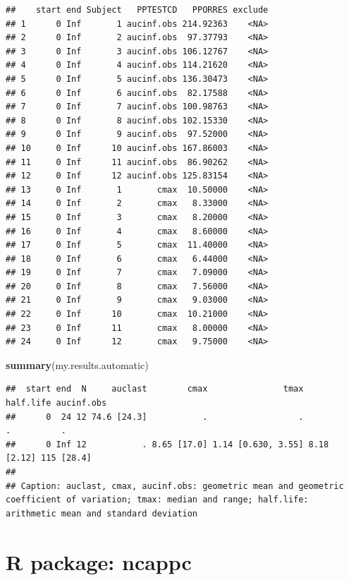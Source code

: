 \documentclass[
  12pt,
]{krantz}
\newenvironment{Shaded}{\begin{snugshade}}{\end{snugshade}}
\newcommand{\KeywordTok}[1]{\textcolor[rgb]{0.13,0.29,0.53}{\textbf{#1}}}
\newcommand{\NormalTok}[1]{#1}
\begin{document}
\begin{verbatim}
##    start end Subject   PPTESTCD   PPORRES exclude
## 1      0 Inf       1 aucinf.obs 214.92363    <NA>
## 2      0 Inf       2 aucinf.obs  97.37793    <NA>
## 3      0 Inf       3 aucinf.obs 106.12767    <NA>
## 4      0 Inf       4 aucinf.obs 114.21620    <NA>
## 5      0 Inf       5 aucinf.obs 136.30473    <NA>
## 6      0 Inf       6 aucinf.obs  82.17588    <NA>
## 7      0 Inf       7 aucinf.obs 100.98763    <NA>
## 8      0 Inf       8 aucinf.obs 102.15330    <NA>
## 9      0 Inf       9 aucinf.obs  97.52000    <NA>
## 10     0 Inf      10 aucinf.obs 167.86003    <NA>
## 11     0 Inf      11 aucinf.obs  86.90262    <NA>
## 12     0 Inf      12 aucinf.obs 125.83154    <NA>
## 13     0 Inf       1       cmax  10.50000    <NA>
## 14     0 Inf       2       cmax   8.33000    <NA>
## 15     0 Inf       3       cmax   8.20000    <NA>
## 16     0 Inf       4       cmax   8.60000    <NA>
## 17     0 Inf       5       cmax  11.40000    <NA>
## 18     0 Inf       6       cmax   6.44000    <NA>
## 19     0 Inf       7       cmax   7.09000    <NA>
## 20     0 Inf       8       cmax   7.56000    <NA>
## 21     0 Inf       9       cmax   9.03000    <NA>
## 22     0 Inf      10       cmax  10.21000    <NA>
## 23     0 Inf      11       cmax   8.00000    <NA>
## 24     0 Inf      12       cmax   9.75000    <NA>
\end{verbatim}

\begin{Shaded}
\begin{Highlighting}[]
\KeywordTok{summary}\NormalTok{(my.results.automatic)}
\end{Highlighting}
\end{Shaded}

\begin{verbatim}
##  start end  N     auclast        cmax               tmax   half.life aucinf.obs
##      0  24 12 74.6 [24.3]           .                  .           .          .
##      0 Inf 12           . 8.65 [17.0] 1.14 [0.630, 3.55] 8.18 [2.12] 115 [28.4]
## 
## Caption: auclast, cmax, aucinf.obs: geometric mean and geometric coefficient of variation; tmax: median and range; half.life: arithmetic mean and standard deviation
\end{verbatim}

\hypertarget{r-package-ncappc}{%
\section{R package: ncappc}\label{r-package-ncappc}}
\end{document}
